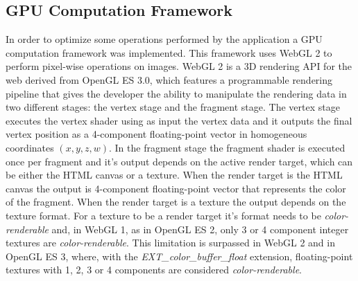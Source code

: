     \subsection {GPU Computation Framework} \label{sec:software:process:gpu} %
    
    
      In order to optimize some operations performed by the application a GPU computation framework was implemented. This framework uses WebGL 2 to perform pixel-wise operations on images. WebGL 2 is a 3D rendering API for the web derived from OpenGL ES 3.0, which features a programmable rendering pipeline that gives the developer the ability to manipulate the rendering data in two different stages: the vertex stage and the fragment stage. The vertex stage executes the vertex shader using as input the vertex data and it outputs the final vertex position as a 4-component floating-point vector in homogeneous coordinates $(x, y, z, w)$. In the fragment stage the fragment shader is executed once per fragment and it's output depends on the active render target, which can be either the HTML canvas or a texture. When the render target is the HTML canvas the output is 4-component floating-point vector that represents the color of the fragment. When the render target is a texture the output depends on the texture format. For a texture to be a render target it's format needs to be \textit{color-renderable} and, in WebGL 1, as in OpenGL ES 2, only 3 or 4 component integer textures are \textit{color-renderable}. This limitation is surpassed in WebGL 2 and in OpenGL ES 3, where, with the \textit{EXT\_color\_buffer\_float} extension, floating-point textures with 1, 2, 3 or 4 components are considered \textit{color-renderable}.
      
